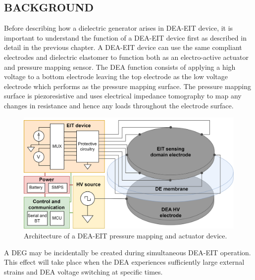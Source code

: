 \subsection{BACKGROUND} 
\label{subsec:background}
Before describing how a dielectric generator arises in DEA-EIT device, it is important to understand the function of a DEA-EIT device first as  described in detail in the previous chapter. A DEA-EIT device can use the same compliant electrodes and dielectric elastomer to function both as an electro-active actuator and pressure mapping sensor. The DEA function consists of applying a high voltage to a bottom electrode leaving the top electrode as the low voltage electrode which performs as the pressure mapping surface. The pressure mapping surface is piezoresistive and uses electrical impedance tomography to map any changes in resistance and hence any loads throughout the electrode surface. 
\begin{figure}[H]
	\centering
	\includegraphics[width=0.8\linewidth]{Figures/DEA-EIT_architecture.png}
	\vspace{0.3cm}
	\caption{Architecture of a DEA-EIT pressure mapping and actuator device.}
	\label{fig:dea-eit-architecture-w-MCU}
\end{figure}

A DEG may be incidentally be created during simultaneous DEA-EIT operation. This effect will take place when the DEA experiences sufficiently large external strains and DEA voltage switching at specific times.

